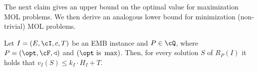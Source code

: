 The next claim gives an upper bound on the optimal value for maximization MOL problems. We then derive an analogous lower bound for minimization (non-trivial) MOL problems. 











	\begin{lemma}
	\label{lem:OptMaxBound}
	Let $I =(E,\cI,c,T)$ be an \textnormal{EMB} instance and $P \in \cQ$, where $P = (\opt,\cF,\triangleleft)$ and $\left(\opt \textnormal{ is } \max\right)$. Then, for every solution $S$ of $R_P(I)$ it holds that $v_I(S) \leq k_I \cdot H_I+T$.  %
\end{lemma}

